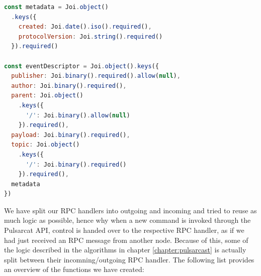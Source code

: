 \begin{lstlisting}[language=JavaScript, float=h, caption={Joi schema for and event descriptor},label={joi-schema-event-descriptor}]
const metadata = Joi.object()
  .keys({
    created: Joi.date().iso().required(),
    protocolVersion: Joi.string().required()
  }).required()

const eventDescriptor = Joi.object().keys({
  publisher: Joi.binary().required().allow(null),
  author: Joi.binary().required(),
  parent: Joi.object()
    .keys({
      '/': Joi.binary().allow(null)
    }).required(),
  payload: Joi.binary().required(),
  topic: Joi.object()
    .keys({
      '/': Joi.binary().required()
    }).required(),
  metadata
})
\end{lstlisting}

We have split our RPC handlers into outgoing and incoming and tried to reuse as much logic as possible, hence why when a new command is invoked through the Pulsarcat API, control is handed over to the respective RPC handler, as if we had just received an RPC message from another node. Because of this, some of the logic described in the algorithms in chapter \ref{chapter:pulsarcast} is actually split between their incomning/outgoing RPC handler. The following list provides an overview of the functions we have created:

